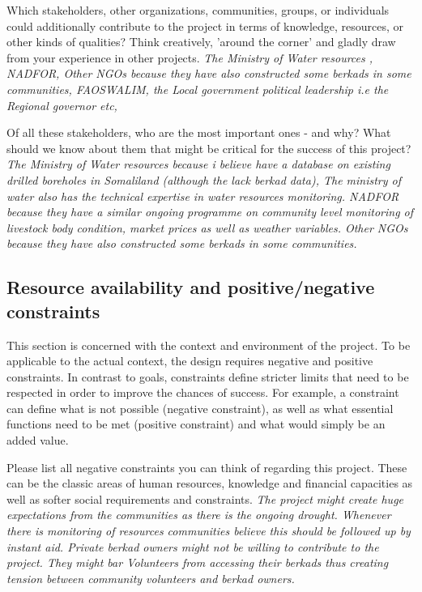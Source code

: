 Which stakeholders, other organizations, communities, groups, or individuals could additionally contribute to the project in terms of knowledge, resources, or other kinds of qualities? Think creatively, 'around the corner' and gladly draw from your experience in other projects.\newline
\textit{The Ministry of Water resources , NADFOR, Other NGOs because they have also constructed some berkads in some communities, FAOSWALIM, the Local government political leadership i.e the Regional governor etc,}

Of all these stakeholders, who are the most important ones - and why? What should we know about them that might be critical for the success of this project?\newline
\textit{The Ministry of Water resources because i believe have a database on existing drilled boreholes in Somaliland (although the lack berkad data), The ministry of water also has the technical expertise in water resources monitoring. NADFOR because they have a similar ongoing programme on community level monitoring of livestock body condition, market prices as well as weather variables. Other NGOs because they have also constructed some berkads in some communities.}

\subsection*{Resource availability and positive/negative constraints}
This section is concerned with the context and environment of the project. To be applicable to the actual context, the design requires negative and positive constraints. In contrast to goals, constraints define stricter limits that need to be respected in order to improve the chances of success. For example, a constraint can define what is not possible (negative constraint), as well as what essential functions need to be met (positive constraint) and what would simply be an added value.

Please list all negative constraints you can think of regarding this project. These can be the classic areas of human resources, knowledge and financial capacities as well as softer social requirements and constraints.\newline
\textit{The project might create huge expectations from the communities as there is the ongoing drought. Whenever there is monitoring of resources communities believe this should be followed up by instant aid. Private berkad owners might not be willing to contribute to the project. They might bar Volunteers from accessing their berkads thus creating tension between community volunteers and berkad owners.}

